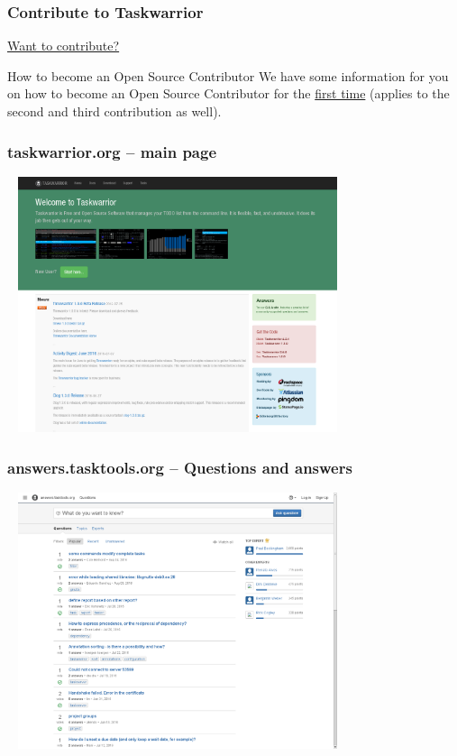 \documentclass[t]{beamer}
\begin{document}
\begin{frame}\frametitle{Contribute to Taskwarrior}
    \vfill
    \href{http://taskwarrior.org/docs/contribute.html}{Want to contribute?}
    \vfill
	\begin{alertblock}{How to become an Open Source Contributor}
		We have some information for you on how to become an Open Source Contributor for the \href{http://taskwarrior.org/docs/first_time.html}{first time} (applies to the second and third contribution as well).
	\end{alertblock}
\end{frame}

\begin{frame}\frametitle{taskwarrior.org -- main page}
    \begin{center}
        \href{http://taskwarrior.org}{\includegraphics[width=10cm,height=7.5cm]{taskwarrior-org.png}}
    \end{center}
\end{frame}

\begin{frame}\frametitle{answers.tasktools.org -- Questions and answers}
    \begin{center}
        \href{http://answers.tasktools.org/}{\includegraphics[width=10cm,height=7.5cm]{answers-tasktools-org.png}}
    \end{center}
\end{frame}
\end{document}
